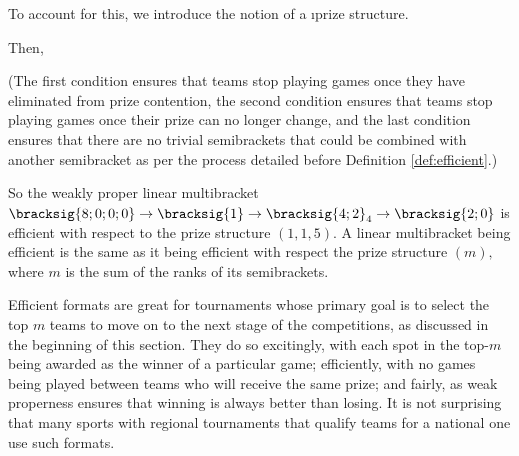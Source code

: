 {    

    To account for this, we introduce the notion of a \i{prize structure}.
    

    Then,


    (The first condition ensures that teams stop playing games once they have eliminated from prize contention, the second condition ensures that teams stop playing games once their prize can no longer change, and the last condition ensures that there are no trivial semibrackets that could be combined with another semibracket as per the process detailed before Definition \ref{def:efficient}.)

    So the weakly proper linear multibracket $\bracksig{8;0;0;0} \to \bracksig{1} \to \bracksig{4;2}_4 \to \bracksig{2;0}$ is efficient with respect to the prize structure $(1, 1, 5).$ A linear multibracket being efficient is the same as it being efficient with respect the prize structure $(m),$ where $m$ is the sum of the ranks of its semibrackets.

    Efficient formats are great for tournaments whose primary goal is to select the top $m$ teams to move on to the next stage of the competitions, as discussed in the beginning of this section. They do so excitingly, with each spot in the top-$m$ being awarded as the winner of a particular game; efficiently, with no games being played between teams who will receive the same prize; and fairly, as weak properness ensures that winning is always better than losing. It is not surprising that many sports with regional tournaments that qualify teams for a national one use such formats.
}
